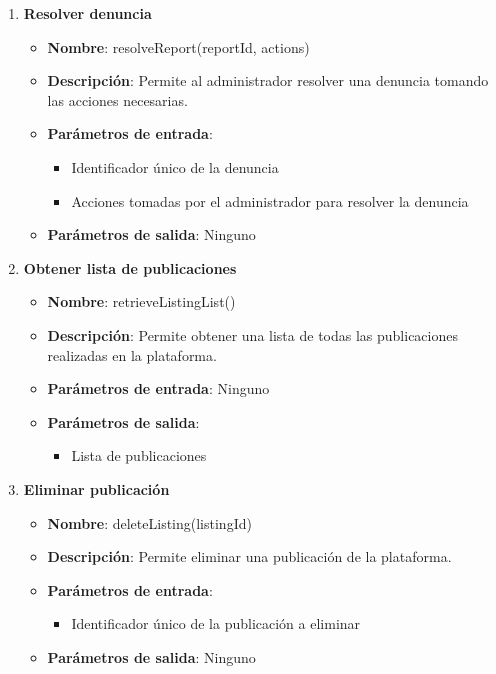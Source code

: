 \begin{enumerate}[label=SOP-\protect\twodigits{\arabic*}:, align=left, leftmargin=*]
\item \textbf{Resolver denuncia}
\begin{itemize}
\item \textbf{Nombre}: resolveReport(reportId, actions)
\item \textbf{Descripción}: Permite al administrador resolver una denuncia tomando las acciones necesarias.
\item \textbf{Parámetros de entrada}:
\begin{itemize}
\item Identificador único de la denuncia
\item Acciones tomadas por el administrador para resolver la denuncia
\end{itemize}
\item \textbf{Parámetros de salida}: Ninguno
\end{itemize}

\item \textbf{Obtener lista de publicaciones}
\begin{itemize}
\item \textbf{Nombre}: retrieveListingList()
\item \textbf{Descripción}: Permite obtener una lista de todas las publicaciones realizadas en la plataforma.
\item \textbf{Parámetros de entrada}: Ninguno
\item \textbf{Parámetros de salida}:
\begin{itemize}
\item Lista de publicaciones
\end{itemize}
\end{itemize}

\item \textbf{Eliminar publicación}
\begin{itemize}
\item \textbf{Nombre}: deleteListing(listingId)
\item \textbf{Descripción}: Permite eliminar una publicación de la plataforma.
\item \textbf{Parámetros de entrada}:
\begin{itemize}
\item Identificador único de la publicación a eliminar
\end{itemize}
\item \textbf{Parámetros de salida}: Ninguno
\end{itemize}


\end{enumerate}
